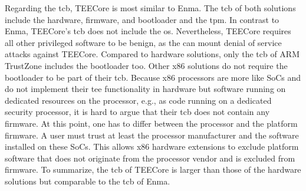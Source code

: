 Regarding the \gls{tcb}, TEECore is most similar to Enma. The \gls{tcb} of both
solutions include the hardware, firmware, and bootloader and the \gls{tpm}. In
contrast to Enma, TEECore's \gls{tcb} does not include the \gls{os}.
Nevertheless, TEECore requires all other privileged software to be benign, as
the can mount denial of service attacks against TEECore. Compared to hardware
solutions, only the \gls{tcb} of ARM TrustZone includes the bootloader too.
Other x86 solutions do not require the bootloader to be part of their \gls{tcb}.
Because x86 processors are more like SoCs and do not implement their \gls{tee}
functionality in hardware but software running on dedicated resources on the
processor, e.g., as code running on a dedicated security processor, it is hard
to argue that their \gls{tcb} does not contain any firmware. At this point, one
has to differ between the processor and the platform firmware. A user must trust
at least the processor manufacturer and the software installed on these SoCs.
This allows x86 hardware extensions to exclude platform software that does not
originate from the processor vendor and is excluded from firmware. To summarize,
the \gls{tcb} of TEECore is larger than those of the hardware solutions but
comparable to the \gls{tcb} of Enma.

\cleardoublepage

